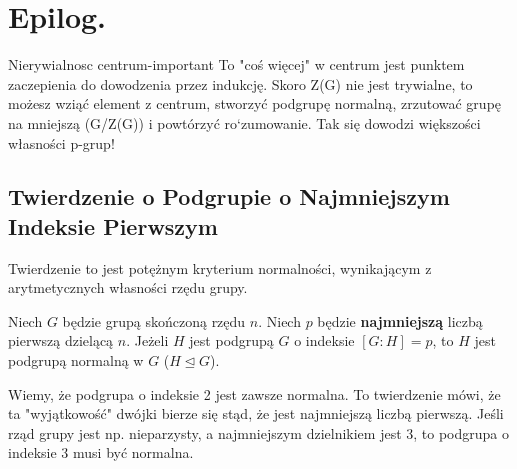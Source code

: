 \chapter{Epilog.}

Nierywialnosc centrum-important
To "coś więcej" w centrum jest punktem zaczepienia do dowodzenia przez indukcję. Skoro Z(G) nie jest trywialne, to możesz wziąć element z centrum, stworzyć podgrupę normalną, zrzutować grupę na mniejszą (G/Z(G)) i powtórzyć ro`zumowanie. Tak się dowodzi większości własności p-grup!

\section{Twierdzenie o Podgrupie o Najmniejszym Indeksie Pierwszym}

Twierdzenie to jest potężnym kryterium normalności, wynikającym z arytmetycznych własności rzędu grupy.

\begin{theorem}
Niech $G$ będzie grupą skończoną rzędu $n$. Niech $p$ będzie \textbf{najmniejszą} liczbą pierwszą dzielącą $n$.
Jeżeli $H$ jest podgrupą $G$ o indeksie $[G:H] = p$, to $H$ jest podgrupą normalną w $G$ ($H \trianglelefteq G$).
\end{theorem}

\begin{intuition}
Wiemy, że podgrupa o indeksie 2 jest zawsze normalna. To twierdzenie mówi, że ta "wyjątkowość" dwójki bierze się stąd, że jest najmniejszą liczbą pierwszą. Jeśli rząd grupy jest np. nieparzysty, a najmniejszym dzielnikiem jest 3, to podgrupa o indeksie 3 musi być normalna.
\end{intuition}


